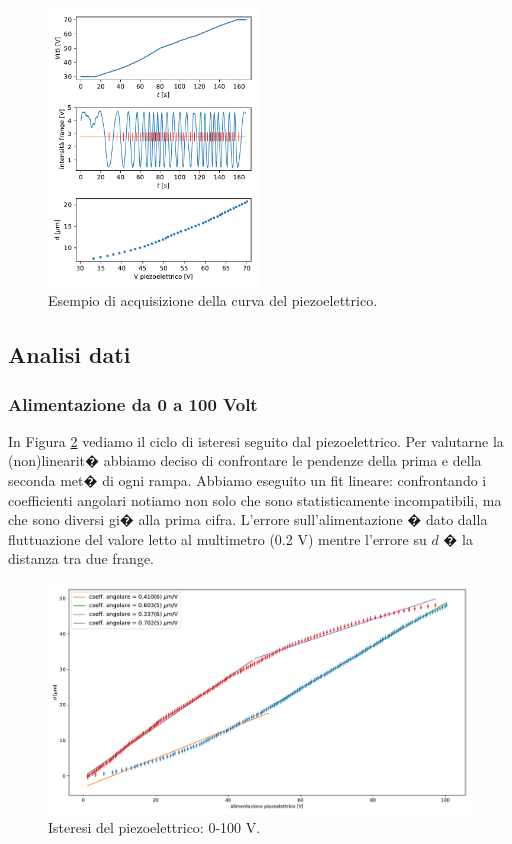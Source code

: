 \documentclass[a4paper]{article}
\begin{document}
\begin{multicols}{2}
\begin{figure}[H]
	\includegraphics[width=0.5\textwidth]{esempio_acquisizione_isteresi.pdf}
	\caption{Esempio di acquisizione della curva del piezoelettrico.}
	\label{fig:esempio_acquisizione_isteresi}
\end{figure}

\subsection{Analisi dati}

\subsubsection{Alimentazione da 0 a 100 Volt}
In Figura \ref{fig:0-100} vediamo il ciclo di isteresi seguito dal piezoelettrico. Per valutarne la (non)linearit� abbiamo deciso di confrontare le pendenze della prima e della seconda met� di ogni rampa. Abbiamo eseguito un fit lineare: confrontando i coefficienti angolari notiamo non solo che sono statisticamente incompatibili, ma che sono diversi gi� alla prima cifra.
L'errore sull'alimentazione � dato dalla fluttuazione del valore letto al multimetro (0.2 V) mentre l'errore su $d$ � la distanza tra due frange.

\end{multicols}

\begin{figure}[H]
	\includegraphics[width=1\textwidth]{isteresi_0-100.pdf}
	\caption{Isteresi del piezoelettrico: 0-100 V.}
	\label{fig:0-100}
\end{figure}
\end{document}
